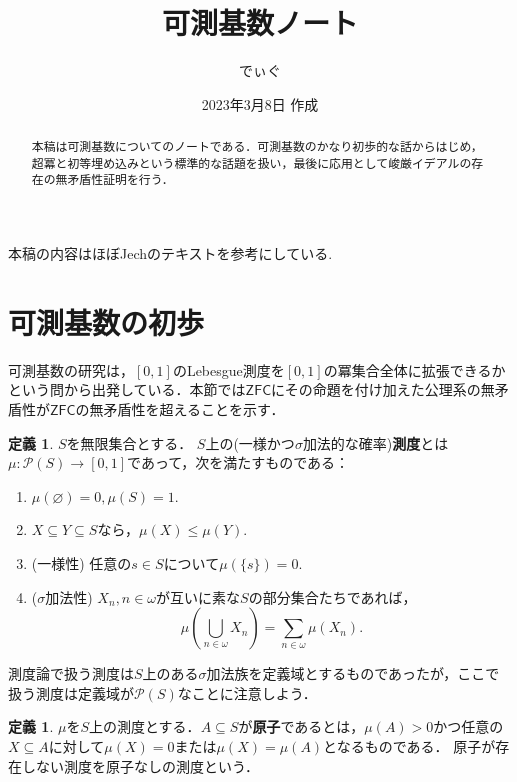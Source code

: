 \documentclass[uplatex]{jsarticle}
\title{可測基数ノート}
\date{2023年3月8日 作成}
\author{でぃぐ}
\newcommand{\Pow}{\mathcal{P}}
\newcommand{\ZFC}{\mathsf{ZFC}}
\renewcommand\emptyset{\varnothing}
\renewcommand\subset{\subseteq}
\theoremstyle{definition}
\newtheorem{defi}[thm]{定義}
\begin{document}
	
	\maketitle
	
	\begin{abstract}
		本稿は可測基数についてのノートである．可測基数のかなり初歩的な話からはじめ，超冪と初等埋め込みという標準的な話題を扱い，最後に応用として峻厳イデアルの存在の無矛盾性証明を行う．
	\end{abstract}
	
	\tableofcontents
	
	\vspace{1cm}
	
	本稿の内容はほぼJechのテキスト\cite{jech2006set}を参考にしている.
	
	\section{可測基数の初歩}
	
	可測基数の研究は，$[0, 1]$のLebesgue測度を$[0, 1]$の冪集合全体に拡張できるかという問から出発している．本節では$\ZFC$にその命題を付け加えた公理系の無矛盾性が$\ZFC$の無矛盾性を超えることを示す．
	
	\begin{defi}
		$S$を無限集合とする． $S$上の(一様かつ$\sigma$加法的な確率)\textbf{測度}とは$\mu \colon \Pow(S) \to [0, 1]$であって，次を満たすものである：
		\begin{enumerate}
			\item $\mu(\emptyset) = 0, \mu(S) = 1$.
			\item $X \subset Y \subset S$なら，$\mu(X) \le \mu(Y)$.
			\item (一様性) 任意の$s \in S$について$\mu(\{s\}) = 0$.
			\item ($\sigma$加法性) $X_n, n \in \omega$が互いに素な$S$の部分集合たちであれば，
			\[
			\mu\left(\bigcup_{n \in \omega} X_n\right) = \sum_{n \in \omega} \mu(X_n). 
			\]
		\end{enumerate}
	\end{defi}
	
	測度論で扱う測度は$S$上のある$\sigma$加法族を定義域とするものであったが，ここで扱う測度は定義域が$\Pow(S)$なことに注意しよう．
	
	\begin{defi}
		$\mu$を$S$上の測度とする．$A \subset S$が\textbf{原子}であるとは，$\mu(A) > 0$かつ任意の$X \subset A$に対して$\mu(X) = 0$または$\mu(X) = \mu(A)$となるものである．
		原子が存在しない測度を原子なしの測度という．
	\end{defi}
	
\end{document}
